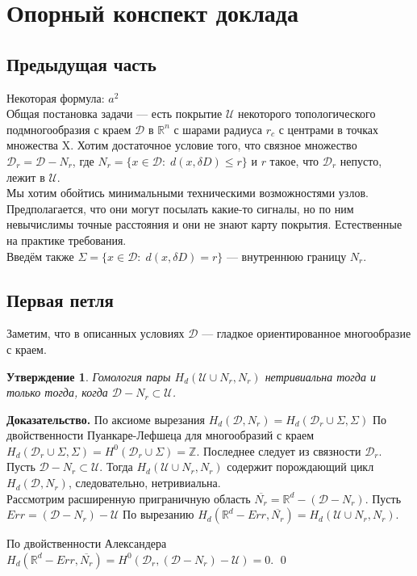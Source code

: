 \documentclass[english,12pt]{article}
\newcounter{stmcounter}[section]
\numberwithin{equation}{section}
\newtheorem{proposition}[stmcounter]{Утверждение}
\theoremstyle{definition}
\theoremstyle{remark}
\newenvironment{pf}{\noindent\textbf{Доказательство.}}{\qed}
\renewcommand{\leq}{\leqslant}
\begin{document}
\section{Опорный конспект доклада}

\subsection{Предыдущая часть}

Некоторая формула: $a^2$\\

Общая постановка задачи --- есть покрытие $\mathcal{U}$ некоторого топологического подмногообразия с краем $\mathcal{D}$ в $\mathbb{R}^n$ с шарами радиуса $r_c$ с центрами в точках множества $\mathrm{X}$. Хотим достаточное условие того, что связное множество $\mathcal{D}_r = \mathcal{D} - N_r$, где $N_r = \{x \in \mathcal{D}:\; d(x,\delta D) \leq r\}$ и $r$ такое, что $\mathcal{D}_r$ непусто, лежит в $\mathcal{U}$.\\

Мы хотим обойтись минимальными техническими возможностями узлов. Предполагается, что они могут посылать какие-то сигналы, но по ним невычислимы точные расстояния и они не знают карту покрытия. Естественные на практике требования.\\

Введём также $\Sigma = \{x \in \mathcal{D}:\; d(x,\delta D) = r\}$ --- внутреннюю границу $N_r$.

\subsection{Первая петля}

Заметим, что в описанных условиях $\mathcal{D}$ --- гладкое ориентированное многообразие с краем.

\begin{proposition}
  Гомология пары $H_d(\mathcal{U} \cup N_r, N_r)$ нетривиальна тогда и только тогда, когда $\mathcal{D} - N_r \subset \mathcal{U}$.
\end{proposition}

\begin{pf}
  По аксиоме вырезания $H_d(\mathcal{D}, N_r) = H_d(\mathcal{D}_r \cup \Sigma, \Sigma)$ По двойственности Пуанкаре-Лефшеца для многообразий с краем $H_d(\mathcal{D}_r \cup \Sigma, \Sigma) = H^0(\mathcal{D}_r \cup \Sigma) = \mathbb{Z}$. Последнее следует из связности $\mathcal{D}_r$.\\

  Пусть $\mathcal{D} - N_r \subset \mathcal{U}$. Тогда $H_d(\mathcal{U} \cup N_r, N_r)$ содержит порождающий цикл $H_d(\mathcal{D}, N_r)$, следовательно, нетривиальна.\\

  Рассмотрим расширенную приграничную область $\overline{N_r} = \mathbb{R}^d - (\mathcal{D} - N_r)$. Пусть $Err = (\mathcal{D} - N_r) - \mathcal{U}$ По вырезанию $H_d(\mathbb{R}^d - Err, \overline{N_r}) = H_d(\mathcal{U} \cup N_r, N_r)$.

  По двойственности Александера $H_d(\mathbb{R}^d - Err, \overline{N_r}) = H^0(\mathcal{D}_r, (\mathcal{D} - N_r) - \mathcal{U}) = 0$.
\end{pf}
\end{document}
